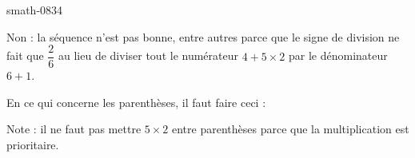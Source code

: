 
\begin{corrige}{smath-0834}

    Non : la séquence n'est pas bonne, entre autres parce que le signe de division ne fait que \( \dfrac{ 2 }{ 6 }\) au lieu de diviser tout le numérateur \( 4+5\times 2\) par le dénominateur \( 6+1\).

    En ce qui concerne les parenthèses, il faut faire ceci :
    \begin{equation}
        
    \end{equation}

    Note : il ne faut pas mettre \( 5\times 2\) entre parenthèses parce que la multiplication est prioritaire.

\end{corrige}
